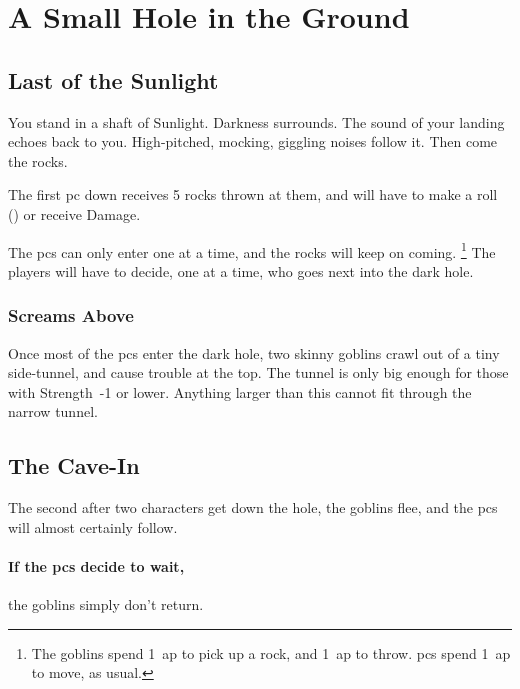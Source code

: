 \needspace{15em}
\section{A Small Hole in the Ground}
\label{goblinCaveEntrance}

\begin{multicols}{2}
\renewcommand\npcsymbol{\gls{night}}

\subsection{Last of the Sunlight}

\begin{boxtext}
  You stand in a shaft of Sunlight.
  Darkness surrounds.
  The sound of your landing echoes back to you.
  High-pitched, mocking, giggling noises follow it.
  Then come the rocks.
\end{boxtext}

The first \gls{pc} down receives 5 rocks thrown at them, and will have to make a  roll (\tn[10]) or receive  Damage.

The \glspl{pc} can only enter one at a time, and the rocks will keep on coming.%
\footnote{The goblins spend 1~\gls{ap} to pick up a rock, and 1~\gls{ap} to throw.
\Glspl{pc} spend 1~\gls{ap} to move, as usual.}
The players will have to decide, one at a time, who goes next into the dark hole.

\playCommentaryDust

\subsubsection{Screams Above}

Once most of the \glspl{pc} enter the dark hole, two skinny goblins crawl out of a tiny side-tunnel, and cause trouble at the top.
The tunnel is only big enough for those with Strength~-1 or lower.
Anything larger than this cannot fit through the narrow tunnel.

\subsection{The Cave-In}

The second after two characters get down the hole, the goblins flee, and the \glspl{pc} will almost certainly follow.

\paragraph{If the \glspl{pc} decide to wait,}
the goblins simply don't return.


\end{multicols}
